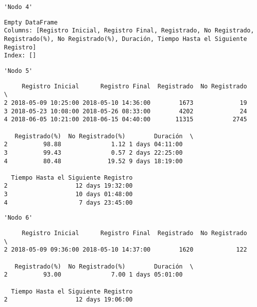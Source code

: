 \documentclass[11pt]{article}
\begin{document}
    
    
    \begin{verbatim}
'Nodo 4'
    \end{verbatim}

    
    
    \begin{verbatim}
Empty DataFrame
Columns: [Registro Inicial, Registro Final, Registrado, No Registrado, Registrado(%), No Registrado(%), Duración, Tiempo Hasta el Siguiente Registro]
Index: []
    \end{verbatim}

    
    
    \begin{verbatim}
'Nodo 5'
    \end{verbatim}

    
    
    \begin{verbatim}
     Registro Inicial      Registro Final  Registrado  No Registrado  \
2 2018-05-09 10:25:00 2018-05-10 14:36:00        1673             19   
3 2018-05-23 10:08:00 2018-05-26 08:33:00        4202             24   
4 2018-06-05 10:21:00 2018-06-15 04:40:00       11315           2745   

   Registrado(%)  No Registrado(%)        Duración  \
2          98.88              1.12 1 days 04:11:00   
3          99.43              0.57 2 days 22:25:00   
4          80.48             19.52 9 days 18:19:00   

  Tiempo Hasta el Siguiente Registro  
2                   12 days 19:32:00  
3                   10 days 01:48:00  
4                    7 days 23:45:00  
    \end{verbatim}

    
    
    \begin{verbatim}
'Nodo 6'
    \end{verbatim}

    
    
    \begin{verbatim}
     Registro Inicial      Registro Final  Registrado  No Registrado  \
2 2018-05-09 09:36:00 2018-05-10 14:37:00        1620            122   

   Registrado(%)  No Registrado(%)        Duración  \
2          93.00              7.00 1 days 05:01:00   

  Tiempo Hasta el Siguiente Registro  
2                   12 days 19:06:00  
    \end{verbatim}
\end{document}
